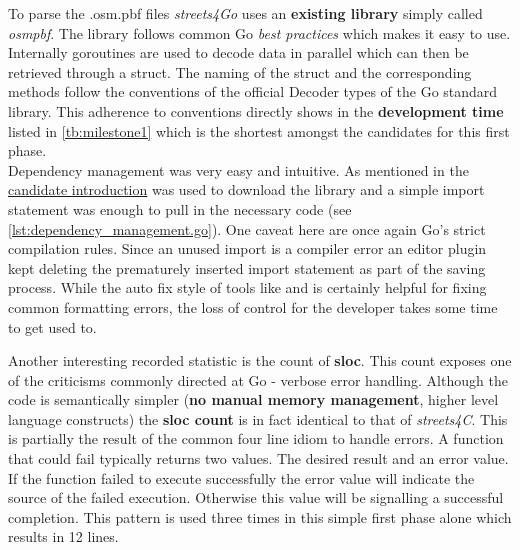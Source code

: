 To parse the .osm.pbf files \textit{streets4Go} uses an \textbf{existing library} simply called \textit{osmpbf}. The library follows common Go \textit{best practices} which makes it easy to use. Internally \glspl{goroutine} are used to decode data in parallel which can then be retrieved through a  struct. The naming of the struct and the corresponding methods follow the conventions of the official Decoder types of the Go standard library. This adherence to conventions directly shows in the \textbf{development time} listed in \autoref{tb:milestone1} which is the shortest amongst the candidates for this first phase.
\\


Dependency management was very easy and intuitive. As mentioned in the \hyperref[subsec:State_of_the_art::Candidates::Go]{candidate introduction}  was used to download the library and a simple import statement was enough to pull in the necessary code (see \autoref{lst:dependency_management.go}). One caveat here are once again Go's strict compilation rules. Since an unused import is a compiler error an editor plugin kept deleting the prematurely inserted import statement as part of the saving process. While the auto fix style of tools like  and  is certainly helpful for fixing common formatting errors, the loss of control for the developer takes some time to get used to.

Another interesting recorded statistic is the count of \textbf{\acrlong{sloc}}. This count exposes one of the criticisms commonly directed at Go - verbose error handling. Although the code is semantically simpler (\textbf{no manual memory management}, higher level language constructs) the \textbf{\gls{sloc} count} is in fact identical to that of \textit{streets4C}. This is partially the result of the common four line idiom to handle errors. A function that could fail typically returns two values. The desired result and an error value. If the function failed to execute successfully the error value will indicate the source of the failed execution. Otherwise this value will be  signalling a successful completion. This pattern is used three times in this simple first phase alone which results in 12 lines.
\\


